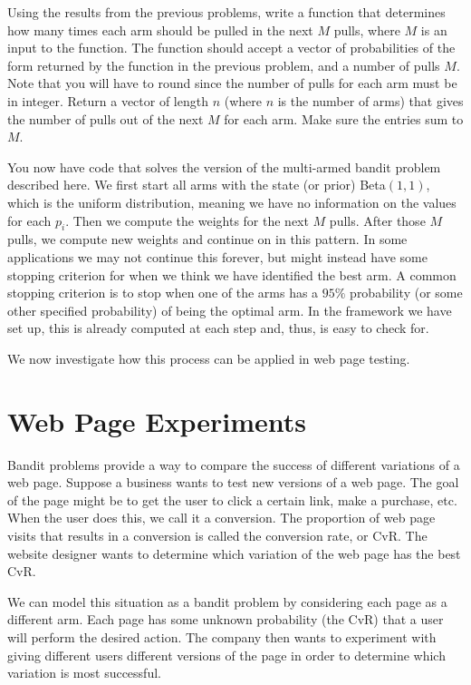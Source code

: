 \begin{problem}
Using the results from the previous problems, write a function  that determines how many
times each arm should be pulled in the next $M$ pulls, where $M$ is an input to the function.
The function should accept a vector of probabilities of the form returned by the
function in the previous problem, and a number of pulls $M$.
Note that you will have to round since the number of pulls for each arm must be in integer.
Return a vector of length $n$ (where $n$ is the number of arms) that gives the number of
pulls out of the next $M$ for each arm.  Make sure the entries sum to $M$.
\end{problem}

You now have code that solves the version of the multi-armed bandit problem described here.
We first start all arms with the state (or prior) Beta$(1,1)$,
which is the uniform distribution, meaning we have no information on the values for each $p_i$.
Then we compute the weights for the next $M$ pulls.
After those $M$ pulls, we compute new weights and continue on in this pattern.
In some applications we may not continue this forever, but might instead have some stopping
criterion for when we think we have identified the best arm.
A common stopping criterion is to stop when one of the arms has a $95\%$ probability
(or some other specified probability) of being the optimal arm.
In the framework we have set up, this is already computed at each step and, thus, is easy to check for.

We now investigate how this process can be applied
in web page testing.

\section*{Web Page Experiments}
Bandit problems provide a way to compare the success of different variations of a web page.
Suppose a business wants to test new versions of a web page.
The goal of the page might be to get the user to click a certain link, make a purchase, etc.
When the user does this, we call it a conversion.  The proportion of web page visits
that results in a conversion is called the conversion rate, or CvR.
The website designer wants to determine which variation of the web page has the best CvR.

We can model this situation as a bandit problem by considering each page as a different arm.
Each page has some unknown probability (the CvR) that a user will perform the desired action.
The company then wants to experiment with giving different users different versions of
the page in order to determine which variation is most successful.

